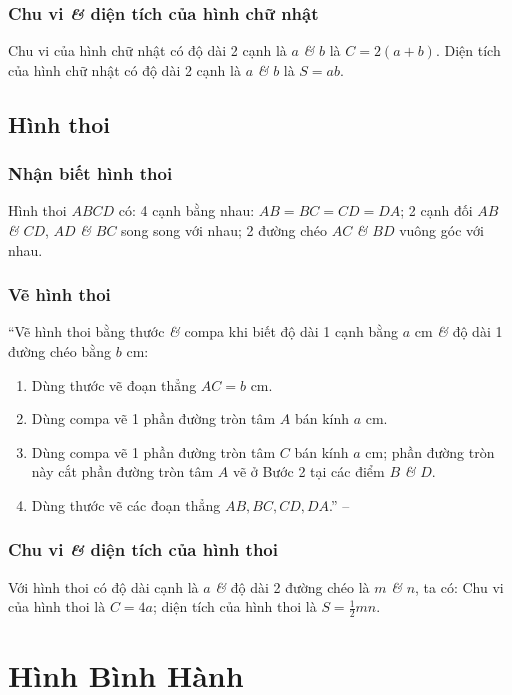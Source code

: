\documentclass[oneside]{book}
\numberwithin{equation}{section}
\begin{document}
\subsubsection{Chu vi \textit{\&} diện tích của hình chữ nhật}
Chu vi của hình chữ nhật có độ dài 2 cạnh là $a$ \textit{\&} $b$ là $C = 2(a + b)$. Diện tích của hình chữ nhật có độ dài 2 cạnh là $a$ \textit{\&} $b$ là $S = ab$.

\subsection{Hình thoi}

\subsubsection{Nhận biết hình thoi}
Hình thoi $ABCD$ có: 4 cạnh bằng nhau: $AB = BC = CD = DA$; 2 cạnh đối $AB$ \textit{\&} $CD$, $AD$ \textit{\&} $BC$ song song với nhau; 2 đường chéo $AC$ \textit{\&} $BD$ vuông góc với nhau.

\subsubsection{Vẽ hình thoi}
``Vẽ hình thoi bằng thước \textit{\&} compa khi biết độ dài 1 cạnh bằng $a$ cm \textit{\&} độ dài 1 đường chéo bằng $b$ cm:
\begin{enumerate}
	\item Dùng thước vẽ đoạn thẳng $AC = b$ cm.
	\item Dùng compa vẽ 1 phần đường tròn tâm $A$ bán kính $a$ cm.
	\item Dùng compa vẽ 1 phần đường tròn tâm $C$ bán kính $a$ cm; phần đường tròn này cắt phần đường tròn tâm $A$ vẽ ở Bước 2 tại các điểm $B$ \textit{\&} $D$.
	\item Dùng thước vẽ các đoạn thẳng $AB,BC,CD,DA$.'' -- \cite[p. 100]{Thai_Anh_Dat_Ha_Loan_Nam_Quang_Toan_6_tap_1}
\end{enumerate}

\subsubsection{Chu vi \textit{\&} diện tích của hình thoi}
Với hình thoi có độ dài cạnh là $a$ \textit{\&} độ dài 2 đường chéo là $m$ \textit{\&} $n$, ta có: Chu vi của hình thoi là $C = 4a$; diện tích của hình thoi là $S = \frac{1}{2}mn$.

\section{Hình Bình Hành}
\end{document}
